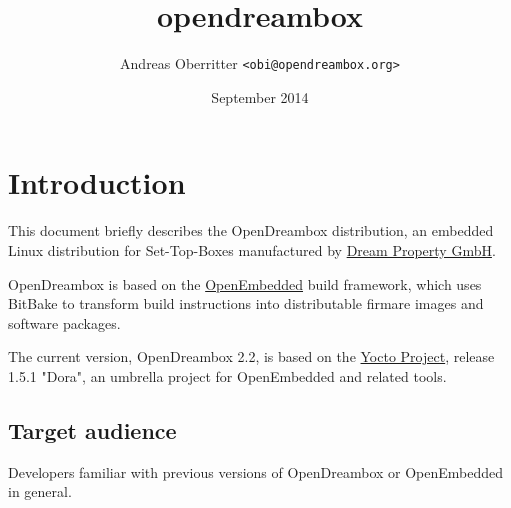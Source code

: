 \documentclass[a4paper]{article}
\newcommand{\shell}[1]{\texttt{\small #1}}
\begin{document}
\title{opendreambox}
\author{Andreas Oberritter \shell{<obi@opendreambox.org>}}
\date{September 2014}
\maketitle
\tableofcontents
\pagebreak

\section{Introduction}
  \begin{flushleft}
    This document briefly describes the OpenDreambox distribution, an embedded Linux
    distribution for Set-Top-Boxes manufactured by \href{http://www.dream-multimedia-tv.de/}{Dream Property GmbH}.

    OpenDreambox is based on the \href{http://www.openembedded.org/}{OpenEmbedded} build framework, which
    uses BitBake to transform build instructions into
    distributable firmare images and software packages.

    The current version, OpenDreambox 2.2, is based on the \href{https://www.yoctoproject.org/}{Yocto Project}, release 
    1.5.1 "Dora", an umbrella project for OpenEmbedded and related tools.
  \end{flushleft}

  \subsection{Target audience}
    \begin{flushleft}
      Developers familiar with previous versions of OpenDreambox or OpenEmbedded
      in general.
    \end{flushleft}
\end{document}
